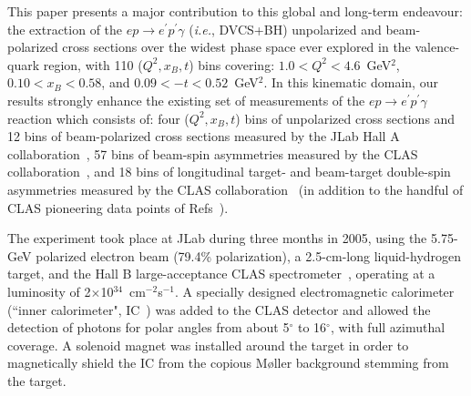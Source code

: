 \documentclass[nofootinbib,twocolumn,showpacs,prl,superscriptaddress,secnumarabic,amssymb,nobibnotes,aps,floatfix]{revtex4-1}
\begin{document}
This paper presents a major contribution to this global and long-term endeavour: the extraction of
the $ep\to e^\prime p^\prime \gamma$ (\textit{i.e.}, DVCS+BH) unpolarized and beam-polarized cross
sections over the widest phase space ever explored in the valence-quark region, with 110
($Q^2,x_B,t$) bins covering:
$1.0<Q^2<4.6$~GeV$^2$, $0.10<x_B<0.58$, and $0.09<-t<0.52$~GeV$^2$.
In this kinematic domain, our results strongly enhance the existing set of
measurements of the $ep\to e^\prime p^\prime \gamma$ reaction which consists of:
four ($Q^2,x_B,t$) bins of unpolarized cross sections and 12 bins of beam-polarized cross sections
measured by the JLab Hall A collaboration~\cite{Munoz Camacho:2006hx},
57 bins of beam-spin asymmetries measured by the CLAS collaboration~\cite{Girod:2007aa},
and 18 bins of longitudinal target- and beam-target double-spin asymmetries measured by the
CLAS collaboration~\cite{Seder:2015,Pisano:2015} (in addition to the handful of CLAS pioneering data
points of Refs~\cite{Stepanyan:2001sm,Chen:2006na,Gavalian:2009}).

The experiment took place at JLab during three months in 2005, using the 5.75-GeV polarized
electron beam (79.4\% polarization), a 2.5-cm-long liquid-hydrogen 
target, and the Hall B large-acceptance CLAS spectrometer~\cite{Mecking:2003zu},
operating at a luminosity of 2$\times$10$^{34}$~cm$^{-2}$s$^{-1}$.
A specially designed electromagnetic calorimeter (``inner calorimeter",
IC~\cite{Girod:2007aa}) was added to the CLAS detector and allowed the detection of photons
for polar angles from about 5$^\circ$ to 16$^\circ$, with full azimuthal coverage.
A solenoid magnet was installed around the target in order to magnetically shield the IC from
the copious M{\o}ller background stemming from the target.
\end{document}
